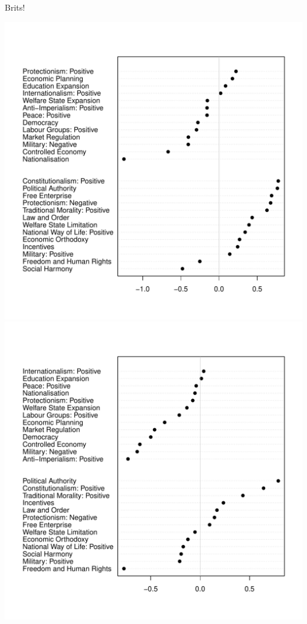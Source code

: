 \documentclass{hertieteaching}
\begin{document}
\begin{frame}{Brits!}

\centerline{\includegraphics[scale=0.4]{pictures/UK_items}\pause \includegraphics[scale=0.4]{pictures/UK_items_only_main_parties}}
\end{frame}
\end{document}
